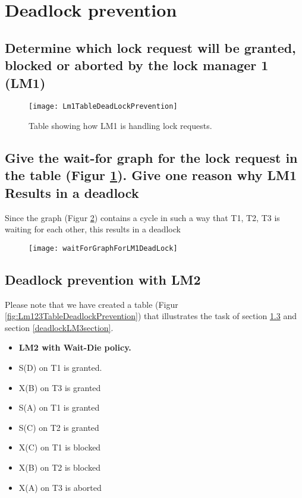 \section{Deadlock prevention}
\subsection{Determine which lock request will be granted, blocked or aborted by the lock manager 1 (LM1)}\label{deadlockLM1section}

\begin{figure}[H]
\centering
\texttt{[image: Lm1TableDeadLockPrevention]}
\caption[Table showing how LM1 is handling locks]{Table showing how LM1 is handling lock requests.}
\label{fig:Lm1TableDeadlock}
\end{figure}
\pagebreak
\subsection{Give the wait-for graph for the lock request in the table (Figur \ref{fig:Lm1TableDeadlock}). Give one reason why LM1 Results in a deadlock }

Since the graph (Figur \ref{fig:waitForGraphForLM1DeadLock}) contains a cycle in such a way that T1, T2, T3 is waiting for each other, this results in a deadlock

\begin{figure} [H]
\centering
\texttt{[image: waitForGraphForLM1DeadLock]}
\caption[Wait-for graph of LM1 depicting a deadlock.]{}
\caption{}
\label{fig:waitForGraphForLM1DeadLock}
\end{figure}

	
\pagebreak
\subsection{Deadlock prevention with LM2} \label{deadlockLM2section}
Please note that we have created a table (Figur \ref{fig:Lm123TableDeadlockPrevention}) that illustrates the task of section \ref{deadlockLM2section} and section \ref{deadlockLM3section}.
\begin{itemize}
	\item{\textbf{LM2 with Wait-Die policy.}}
	\item S(D) on T1 is granted.
	\item X(B) on T3 is granted
	\item S(A) on T1 is granted
	\item S(C) on T2 is granted
	\item X(C) on T1 is blocked
	\item X(B) on T2 is blocked
	\item X(A) on T3 is aborted
\end{itemize}

